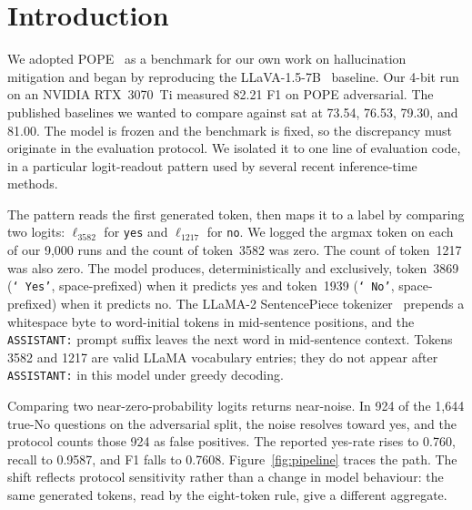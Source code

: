 \documentclass{article}
\begin{document}
\section{Introduction}
\label{sec:intro}

We adopted POPE~\citep{li2023evaluating} as a benchmark for our own work
on hallucination mitigation and began by reproducing the
LLaVA-1.5-7B~\citep{liu2023improved} baseline. Our 4-bit run on an
NVIDIA RTX~3070~Ti measured 82.21 F1 on POPE adversarial. The published
baselines we wanted to compare against sat at 73.54, 76.53, 79.30, and
81.00. The model is frozen and the benchmark is fixed, so the
discrepancy must originate in the evaluation protocol. We isolated it
to one line of evaluation code, in a particular logit-readout pattern
used by several recent inference-time methods.

The pattern reads the first generated token, then maps it to a label
by comparing two logits: $\ell_{3582}$ for \texttt{yes} and
$\ell_{1217}$ for \texttt{no}. We logged the argmax token on each of
our 9{,}000 runs and the count of token~3582 was zero. The count of
token~1217 was also zero. The model produces, deterministically and
exclusively, token~3869 (\texttt{`\,Yes'}, space-prefixed) when it
predicts yes and token~1939 (\texttt{`\,No'}, space-prefixed) when it
predicts no. The LLaMA-2 SentencePiece
tokenizer~\citep{kudo2018sentencepiece,touvron2023llama2} prepends a
whitespace byte to word-initial tokens in mid-sentence positions, and
the \texttt{ASSISTANT:} prompt suffix leaves the next word in
mid-sentence context. Tokens 3582 and 1217 are valid LLaMA vocabulary
entries; they do not appear after \texttt{ASSISTANT:} in this model
under greedy decoding.

Comparing two near-zero-probability logits returns near-noise. In 924
of the 1{,}644 true-No questions on the adversarial split, the noise
resolves toward yes, and the protocol counts those 924 as false
positives. The reported yes-rate rises to 0.760, recall to 0.9587,
and F1 falls to 0.7608. Figure~\ref{fig:pipeline} traces the path.
The shift reflects protocol sensitivity rather than a change in model
behaviour: the same generated tokens, read by the eight-token rule,
give a different aggregate.
\end{document}
